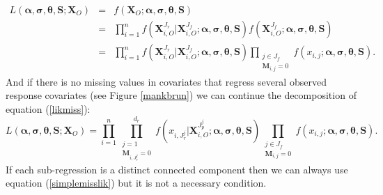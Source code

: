 \documentclass[12pt,a4paper]{report}
\begin{document}

\begin{eqnarray}
	L(\boldsymbol{\alpha},\boldsymbol{\sigma},\boldsymbol{\theta},\boldsymbol{S};\boldsymbol{X}_O)&=& 
	f(\boldsymbol{X}_{O};\boldsymbol{\alpha},\boldsymbol{\sigma},\boldsymbol{\theta},\boldsymbol{S}) \nonumber \\
&=&	\prod_{i=1}^nf(\boldsymbol{X}^{J_r}_{i,O}|\boldsymbol{X}^{J_f}_{i,O};\boldsymbol{\alpha},\boldsymbol{\sigma},\boldsymbol{\theta},\boldsymbol{S})f(\boldsymbol{X}^{J_f}_{i,O};\boldsymbol{\alpha},\boldsymbol{\sigma},\boldsymbol{\theta},\boldsymbol{S})\quad   \nonumber \\
	&=&\prod_{i=1}^nf(\boldsymbol{X}^{J_r}_{i,O}|\boldsymbol{X}^{J_f}_{i,O};\boldsymbol{\alpha},\boldsymbol{\sigma},\boldsymbol{\theta},\boldsymbol{S})\prod_{\substack{j \in J_f \\ \boldsymbol{M}_{i,j}=0}}f(x_{i,j};\boldsymbol{\alpha},\boldsymbol{\sigma},\boldsymbol{\theta},\boldsymbol{S}).\label{likmiss}
\end{eqnarray}
And if there is no missing values in covariates that regress several observed response covariates (see Figure \ref{mankbrun}) we can continue the decomposition of equation (\ref{likmiss}):
	\begin{equation}
		L(\boldsymbol{\alpha},\boldsymbol{\sigma},\boldsymbol{\theta},\boldsymbol{S};\boldsymbol{X}_O)=\prod_{i=1}^n\prod_{\substack{j =1 \\ \boldsymbol{M}_{i,J_r^j}=0}}^{d_r}f(x_{i,J_r^j}|\boldsymbol{X}^{J_p^j}_{i,O};\boldsymbol{\alpha},\boldsymbol{\sigma},\boldsymbol{\theta},\boldsymbol{S})\prod_{\substack{j \in J_f \\ \boldsymbol{M}_{i,j}=0}}f(x_{i,j};\boldsymbol{\alpha},\boldsymbol{\sigma},\boldsymbol{\theta},\boldsymbol{S}). \label{simplemisslik}
\end{equation}	
If each sub-regression is a distinct connected component then we can always use equation (\ref{simplemisslik}) but it is not a necessary condition. \\
\end{document}
